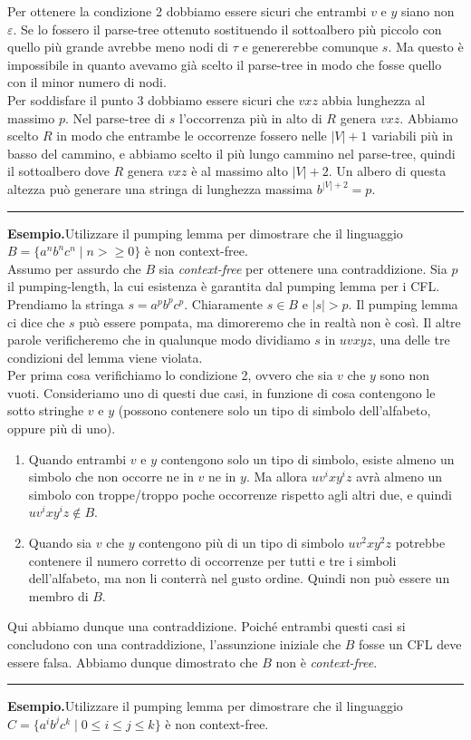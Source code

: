 \documentclass[italian]{article}
\newcommand{\linea}{\begin{center}\rule{5cm}{1pt}\end{center}}
\newcommand{\taleche}{\;|\;}
\newcommand{\len}[1]{\text{$|#1|$}}
\newcommand{\example}{\noindent\textbf{Esempio.\quad}}
\begin{document}
	\noindent
	Per ottenere la condizione 2 dobbiamo essere sicuri che entrambi $v$ e $y$ siano non $\varepsilon$. Se lo fossero il parse-tree ottenuto sostituendo il sottoalbero più piccolo con quello più grande avrebbe meno nodi di $\tau$ e genererebbe comunque $s$. Ma questo è impossibile in quanto avevamo già scelto il parse-tree in modo che fosse quello con il minor numero di nodi. \\
	
	\noindent
	Per soddisfare il punto 3 dobbiamo essere sicuri che $vxz$ abbia lunghezza al massimo $p$. Nel parse-tree di $s$ l'occorrenza più in alto di $R$ genera $vxz$. Abbiamo scelto $R$ in modo che entrambe le occorrenze fossero nelle $\len{V}+1$ variabili più in basso del cammino, e abbiamo scelto il più lungo cammino nel parse-tree, quindi il sottoalbero dove $R$ genera $vxz$ è al massimo alto $\len{V}+2$. Un albero di questa altezza può generare una stringa di lunghezza massima $b^{\len{V}+2} = p$. 
	
	\linea
	\example Utilizzare il pumping lemma per dimostrare che il linguaggio $B = \{ a^nb^nc^n \taleche n > \geq 0 \}$ è non context-free. \\
	
	\noindent
	Assumo per assurdo che $B$ sia \textit{context-free} per ottenere una contraddizione. Sia $p$ il pumping-length, la cui esistenza è garantita dal pumping lemma per i CFL. Prendiamo la stringa $s = a^pb^pc^p$. Chiaramente $s \in B$ e $\len{s} > p$. Il pumping lemma ci dice che $s$ può essere pompata, ma dimoreremo che in realtà non è così. Il altre parole verificheremo che in qualunque modo dividiamo $s$ in $uvxyz$, una delle tre condizioni del lemma viene violata. \\
	Per prima cosa verifichiamo lo condizione 2, ovvero che sia $v$ che $y$ sono non vuoti. Consideriamo uno di questi due casi, in funzione di cosa contengono le sotto stringhe $v$ e $y$ (possono contenere solo un tipo di simbolo dell'alfabeto, oppure più di uno).
	\begin{enumerate}
		\item Quando entrambi $v$ e $y$ contengono solo un tipo di simbolo, esiste almeno un simbolo che non occorre ne in $v$ ne in $y$. Ma allora $uv^ixy^iz$ avrà almeno un simbolo con troppe/troppo poche occorrenze rispetto agli altri due, e quindi  $uv^ixy^iz \notin B$.
		\item Quando sia $v$ che $y$ contengono più di un tipo di simbolo  $uv^2xy^2z$ potrebbe contenere il numero corretto di occorrenze per tutti e tre i simboli dell'alfabeto, ma non li conterrà nel gusto ordine. Quindi  non può essere un membro di $B$. 
	\end{enumerate}
	Qui abbiamo dunque una contraddizione. Poiché entrambi questi casi si concludono con una contraddizione, l'assunzione iniziale che $B$ fosse un CFL deve essere falsa. Abbiamo dunque dimostrato che $B$ non è \textit{context-free}.
	\linea
	\example Utilizzare il pumping lemma per dimostrare che il linguaggio $C = \{ a^ib^jc^k \taleche 0 \leq i \leq j \leq k \}$ è non context-free. \\
	
\end{document}

